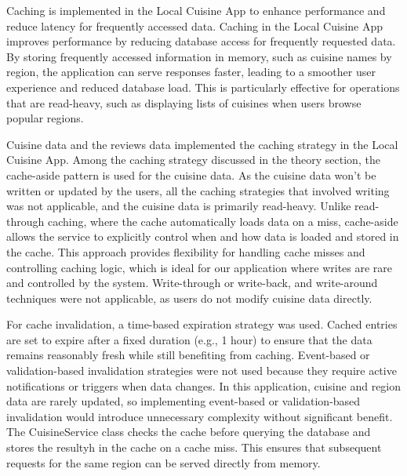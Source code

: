 Caching is implemented in the Local Cuisine App to enhance performance and 
reduce latency for frequently accessed data.  
Caching in the Local Cuisine App improves performance by reducing database access for frequently requested data.
By storing frequently accessed information in memory, such as cuisine names by region,
the application can serve responses faster, leading to a smoother user experience and reduced database load.
This is particularly effective for operations that are read-heavy, such as displaying lists of cuisines
when users browse popular regions.

Cuisine data and the reviews data implemented the caching strategy in the Local Cuisine App.
Among the caching strategy discussed in the theory section, the cache-aside pattern is used for the cuisine data.
As the cuisine data won't be written or updated by the users, all the caching strategies that involved writing was not applicable,
and the cuisine data is primarily read-heavy.
Unlike read-through caching, where the cache automatically loads data on a miss,
cache-aside allows the service to explicitly control when and how data is loaded and stored in the cache.
This approach provides flexibility for handling cache misses and controlling caching logic, which is ideal for our application
where writes are rare and controlled by the system.
Write-through or write-back, and write-around techniques were not applicable, as users do not modify cuisine data directly.  

For cache invalidation, a time-based expiration strategy was used. 
Cached entries are set to expire after a fixed duration (e.g., 1 hour) to ensure that the data remains reasonably 
fresh while still benefiting from caching. 
Event-based or validation-based invalidation strategies were not used because they require active
notifications or triggers when data changes. In this application, cuisine and region data are rarely updated,
so implementing event-based or validation-based invalidation would introduce unnecessary complexity without significant benefit.
The CuisineService class checks the cache before querying the database and stores the resultyh
in the cache on a cache miss. This ensures that subsequent requests for the same region
can be served directly from memory.


